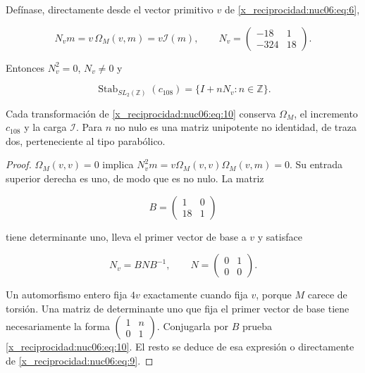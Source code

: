 \begin{theorem}

Defínase, directamente desde el vector primitivo \(v\) de \eqref{x_reciprocidad:nuc06:eq:6},

\begin{equation}
N_v m=v\,\Omega_M(v,m)=v\mathcal I(m),\qquad
N_v=\begin{pmatrix}-18&1\\-324&18\end{pmatrix}.
\label{x_reciprocidad:nuc06:eq:9}
\end{equation}

Entonces \(N_v^2=0\), \(N_v\ne0\) y

\begin{equation}
\boxed{\quad
\operatorname{Stab}_{SL_2(\mathbb Z)}(c_{108})
=\{I+nN_v:n\in\mathbb Z\}.
\quad}
\label{x_reciprocidad:nuc06:eq:10}
\end{equation}

Cada transformación de \eqref{x_reciprocidad:nuc06:eq:10} conserva \(\Omega_M\), el incremento \(c_{108}\) y la carga \(\mathcal I\). Para \(n\) no nulo es una matriz unipotente no identidad, de traza dos, perteneciente al tipo parabólico.
\end{theorem}

\begin{proof}
\(\Omega_M(v,v)=0\) implica \(N_v^2m=v\Omega_M(v,v)\Omega_M(v,m)=0\). Su entrada superior derecha es uno, de modo que es no nulo. La matriz

\[
B=\begin{pmatrix}1&0\\18&1\end{pmatrix}
\]

tiene determinante uno, lleva el primer vector de base a \(v\) y satisface

\begin{equation}
N_v=BNB^{-1},\qquad N=\begin{pmatrix}0&1\\0&0\end{pmatrix}.
\label{x_reciprocidad:nuc06:eq:11}
\end{equation}

Un automorfismo entero fija \(4v\) exactamente cuando fija \(v\), porque \(M\) carece de torsión. Una matriz de determinante uno que fija el primer vector de base tiene necesariamente la forma \(\begin{pmatrix}1&n\\0&1\end{pmatrix}\). Conjugarla por \(B\) prueba \eqref{x_reciprocidad:nuc06:eq:10}. El resto se deduce de esa expresión o directamente de \eqref{x_reciprocidad:nuc06:eq:9}.
\end{proof}

